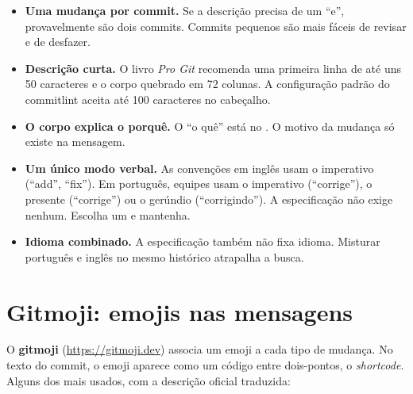 \begin{itemize}
  \item \textbf{Uma mudança por commit.} Se a descrição precisa de um \enquote{e}, provavelmente são dois commits. Commits pequenos são mais fáceis de revisar e de desfazer.
  \item \textbf{Descrição curta.} O livro \emph{Pro Git} recomenda uma primeira linha de até uns 50 caracteres e o corpo quebrado em 72 colunas. A configuração padrão do commitlint aceita até 100 caracteres no cabeçalho.
  \item \textbf{O corpo explica o porquê.} O \enquote{o quê} está no . O motivo da mudança só existe na mensagem.
  \item \textbf{Um único modo verbal.} As convenções em inglês usam o imperativo (\enquote{add}, \enquote{fix}). Em português, equipes usam o imperativo (\enquote{corrige}), o presente (\enquote{corrige}) ou o gerúndio (\enquote{corrigindo}). A especificação não exige nenhum. Escolha um e mantenha.
  \item \textbf{Idioma combinado.} A especificação também não fixa idioma. Misturar português e inglês no mesmo histórico atrapalha a busca.
\end{itemize}

\section{Gitmoji: emojis nas mensagens}

O \textbf{gitmoji} (\url{https://gitmoji.dev}) associa um emoji a cada tipo de mudança. No texto do commit, o emoji aparece como um código entre dois-pontos, o \emph{shortcode}. Alguns dos mais usados, com a descrição oficial traduzida:

